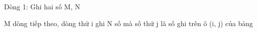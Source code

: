 Dòng 1: Ghi hai số M, N  

   M dòng tiếp theo, dòng thứ i ghi N số mà số thứ j là số ghi trên ô (i, j) của bảng  

\